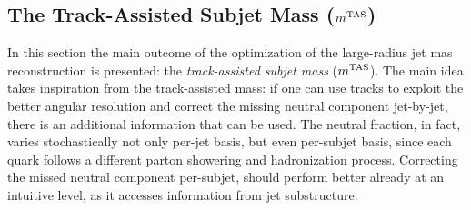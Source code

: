 




\subsection{The Track-Assisted Subjet Mass ($m^\textrm{TAS}$)}\label{subsec:mtas_def}
In this section the main outcome of the optimization of the large-radius jet mas reconstruction is presented: the \textit{track-assisted subjet mass} ($m^\textrm{TAS}$).
The main idea takes inspiration from the track-assisted mass: if one can use tracks to exploit the better angular resolution and correct the missing neutral component jet-by-jet, there is an additional information that can be used. The neutral fraction, in fact, varies stochastically not only per-jet basis, but even per-subjet basis, since each quark follows a different parton showering and hadronization process.
Correcting the missed neutral component per-subjet, should perform better already at an intuitive level, as it accesses information from jet substructure.
  
